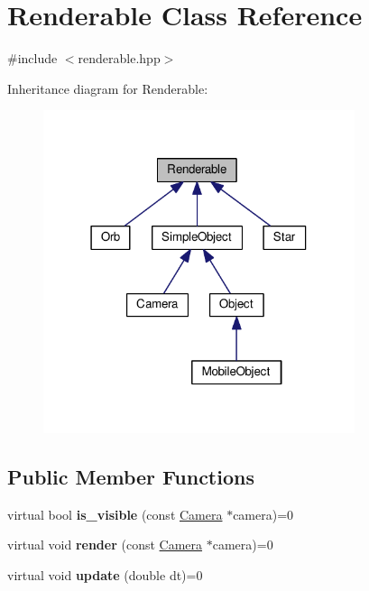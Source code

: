 \hypertarget{class_renderable}{}\section{Renderable Class Reference}
\label{class_renderable}


{\ttfamily \#include $<$renderable.\+hpp$>$}



Inheritance diagram for Renderable\+:\nopagebreak
\begin{figure}[H]
\begin{center}
\leavevmode
\includegraphics[width=259pt]{class_renderable__inherit__graph}
\end{center}
\end{figure}
\subsection*{Public Member Functions}
\begin{DoxyCompactItemize}
\item 
virtual bool {\bfseries is\+\_\+visible} (const \hyperlink{class_camera}{Camera} $\ast$camera)=0\hypertarget{class_renderable_a6a408454645cebdfde19ea048c488eb4}{}\label{class_renderable_a6a408454645cebdfde19ea048c488eb4}

\item 
virtual void {\bfseries render} (const \hyperlink{class_camera}{Camera} $\ast$camera)=0\hypertarget{class_renderable_ab96dd5662a667a725e7fbfeb261c9134}{}\label{class_renderable_ab96dd5662a667a725e7fbfeb261c9134}

\item 
virtual void {\bfseries update} (double dt)=0\hypertarget{class_renderable_af0588aa758ec2bf2dd476ca143167b0c}{}\label{class_renderable_af0588aa758ec2bf2dd476ca143167b0c}

\end{DoxyCompactItemize}


